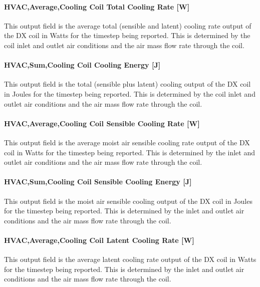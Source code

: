 \paragraph{HVAC,Average,Cooling Coil Total Cooling Rate {[}W{]}}\label{vshpwhheating-output-cooling-coil-total-cooling-rate}
This output field is the average total (sensible and latent) cooling rate output of the DX coil in Watts for the timestep being reported.
This is determined by the coil inlet and outlet air conditions and the air mass flow rate through the coil.

\paragraph{HVAC,Sum,Cooling Coil Cooling Energy {[}J{]}}\label{vshpwhheating-output-cooling-coil-cooling-energy}
This output field is the total (sensible plus latent) cooling output of the DX coil in Joules for the timestep being reported.
This is determined by the coil inlet and outlet air conditions and the air mass flow rate through the coil.

\paragraph{HVAC,Average,Cooling Coil Sensible Cooling Rate {[}W{]}}\label{vshpwhheating-output-cooling-coil-sensible-cooling-rate}
This output field is the average moist air sensible cooling rate output of the DX coil in Watts for the timestep being reported.
This is determined by the inlet and outlet air conditions and the air mass flow rate through the coil.

\paragraph{HVAC,Sum,Cooling Coil Sensible Cooling Energy {[}J{]}}\label{vshpwhheating-output-cooling-coil-sensible-cooling-energy}
This output field is the moist air sensible cooling output of the DX coil in Joules for the timestep being reported.
This is determined by the inlet and outlet air conditions and the air mass flow rate through the coil.

\paragraph{HVAC,Average,Cooling Coil Latent Cooling Rate {[}W{]}}\label{vshpwhheating-output-cooling-coil-latent-cooling-rate}
This output field is the average latent cooling rate output of the DX coil in Watts for the timestep being reported.
This is determined by the inlet and outlet air conditions and the air mass flow rate through the coil.

